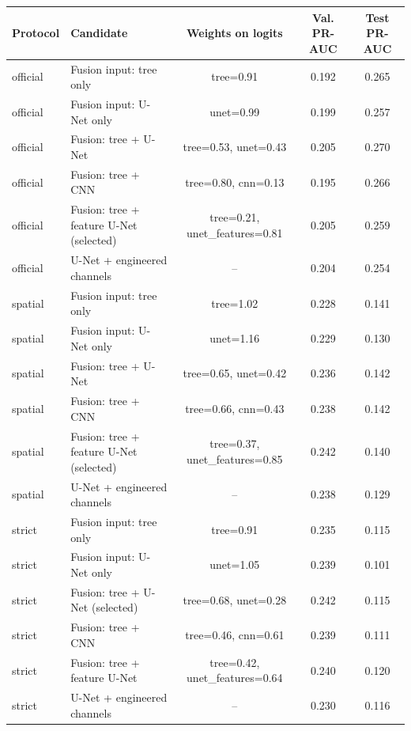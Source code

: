 \begin{tabular}{llccc}
\toprule
Protocol & Candidate & Weights on logits & Val. PR-AUC & Test PR-AUC \\
\midrule
official & Fusion input: tree only & tree=0.91 & 0.192 & 0.265 \\
official & Fusion input: U-Net only & unet=0.99 & 0.199 & 0.257 \\
official & Fusion: tree + U-Net & tree=0.53, unet=0.43 & 0.205 & 0.270 \\
official & Fusion: tree + CNN & tree=0.80, cnn=0.13 & 0.195 & 0.266 \\
official & Fusion: tree + feature U-Net (selected) & tree=0.21, unet\_features=0.81 & 0.205 & 0.259 \\
official & U-Net + engineered channels & -- & 0.204 & 0.254 \\
\midrule
spatial & Fusion input: tree only & tree=1.02 & 0.228 & 0.141 \\
spatial & Fusion input: U-Net only & unet=1.16 & 0.229 & 0.130 \\
spatial & Fusion: tree + U-Net & tree=0.65, unet=0.42 & 0.236 & 0.142 \\
spatial & Fusion: tree + CNN & tree=0.66, cnn=0.43 & 0.238 & 0.142 \\
spatial & Fusion: tree + feature U-Net (selected) & tree=0.37, unet\_features=0.85 & 0.242 & 0.140 \\
spatial & U-Net + engineered channels & -- & 0.238 & 0.129 \\
\midrule
strict & Fusion input: tree only & tree=0.91 & 0.235 & 0.115 \\
strict & Fusion input: U-Net only & unet=1.05 & 0.239 & 0.101 \\
strict & Fusion: tree + U-Net (selected) & tree=0.68, unet=0.28 & 0.242 & 0.115 \\
strict & Fusion: tree + CNN & tree=0.46, cnn=0.61 & 0.239 & 0.111 \\
strict & Fusion: tree + feature U-Net & tree=0.42, unet\_features=0.64 & 0.240 & 0.120 \\
strict & U-Net + engineered channels & -- & 0.230 & 0.116 \\
\bottomrule
\end{tabular}
